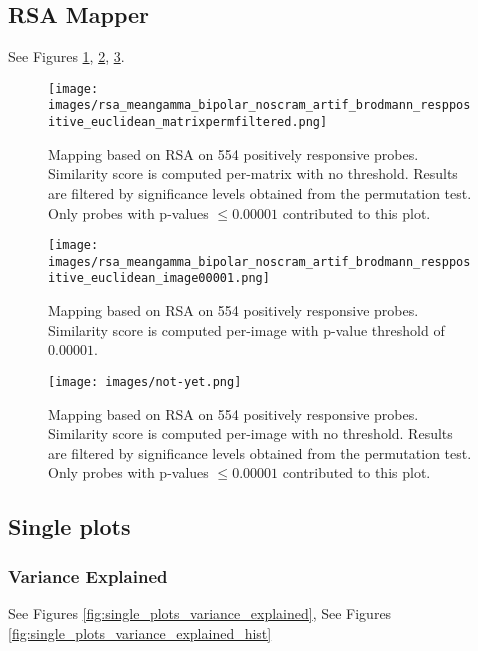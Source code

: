 \documentclass[final]{jneurosci}
\begin{document}
%
%
\subsection{RSA Mapper}

See Figures \ref{fig:rsa-permatrix-permutaton}, \ref{fig:rsa-perimage-threshold}, \ref{fig:rsa-perimage-permutaton}.

\begin{figure}[h]
\centering
\texttt{[image: images/rsa\_meangamma\_bipolar\_noscram\_artif\_brodmann\_resppositive\_euclidean\_matrixpermfiltered.png]}
\caption{Mapping based on RSA on 554 positively responsive probes. Similarity score is computed per-matrix with no threshold. Results are filtered by significance levels obtained from the permutation test. Only probes with p-values $\leq 0.00001$ contributed to this plot.}
\label{fig:rsa-permatrix-permutaton}
\end{figure}

\begin{figure}[h]
\centering
\texttt{[image: images/rsa\_meangamma\_bipolar\_noscram\_artif\_brodmann\_resppositive\_euclidean\_image00001.png]}
\caption{Mapping based on RSA on 554 positively responsive probes. Similarity score is computed per-image with p-value threshold of $0.00001$.}
\label{fig:rsa-perimage-threshold}
\end{figure}

\begin{figure}[h]
\centering
\texttt{[image: images/not-yet.png]}
\caption{Mapping based on RSA on 554 positively responsive probes. Similarity score is computed per-image with no threshold. Results are filtered by significance levels obtained from the permutation test. Only probes with p-values $\leq 0.00001$ contributed to this plot.}
\label{fig:rsa-perimage-permutaton}
\end{figure}


%
%
\subsection{Single plots}

\subsubsection{Variance Explained}
See Figures \ref{fig:single_plots_variance_explained}, See Figures \ref{fig:single_plots_variance_explained_hist}
\end{document}
